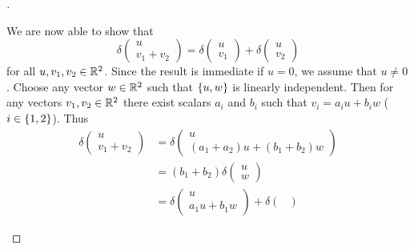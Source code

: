 \begin{proof}[]
\begin{enumerate}
          We are now able to show that
          \[
            \delta\begin{pmatrix}
              u \\
              v_1 + v_2
            \end{pmatrix} = \delta\begin{pmatrix}
              u \\
              v_1
            \end{pmatrix} + \delta\begin{pmatrix}
              u \\
              v_2
            \end{pmatrix}
          \]
          for all \(u, v_1, v_2 \in \mathbb{R}^2\).
          Since the result is immediate if \(u = 0\), we assume that \(u \neq 0\).
          Choose any vector \(w \in \mathbb{R}^2\) such that \(\left\lbrace u, w\right\rbrace\) is linearly independent.
          Then for any vectors \(v_1, v_2 \in \mathbb{R}^2\) there exist scalars \(a_i\) and \(b_i\) such that \(v_i = a_i u + b_i w\) (\(i \in \left\lbrace1, 2\right\rbrace\)).
          Thus
          \begin{align*}
            \delta\begin{pmatrix}
                    u \\
                    v_1 + v_2
                  \end{pmatrix} & = \delta\begin{pmatrix}
                                            u \\
                                            (a_1 + a_2) u + (b_1 + b_2) w
                                          \end{pmatrix}           \\
                                  & = (b_1 + b_2) \delta\begin{pmatrix}
                                                          u \\
                                                          w
                                                        \end{pmatrix}           \\
                                  & = \delta\begin{pmatrix}
                                              u \\
                                              a_1 u + b_1 w
                                            \end{pmatrix} + \delta\begin{pmatrix}

\end{pmatrix}
\end{align*}
\end{enumerate}
\end{proof}
